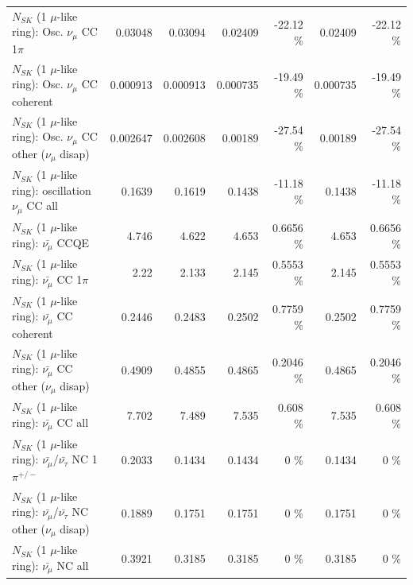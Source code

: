 \begin{table}
\begin{tabular}{| l | r | r | r  r | r  r |}
                          $N_{SK}$ (1 $\mu$-like ring): Osc. $\nu_\mu$ CC 1$\pi$ &         0.03048 &         0.03094 &         0.02409 &   -22.12 \%  &         0.02409 &   -22.12 \%  \\ 
                        $N_{SK}$ (1 $\mu$-like ring): Osc. $\nu_\mu$ CC coherent &        0.000913 &        0.000913 &        0.000735 &   -19.49 \%  &        0.000735 &   -19.49 \%  \\ 
         $N_{SK}$ (1 $\mu$-like ring): Osc. $\nu_\mu$ CC other ($\nu_\mu$ disap) &        0.002647 &        0.002608 &         0.00189 &   -27.54 \%  &         0.00189 &   -27.54 \%  \\ 
                      $N_{SK}$ (1 $\mu$-like ring): oscillation $\nu_\mu$ CC all &          0.1639 &          0.1619 &          0.1438 &   -11.18 \%  &          0.1438 &   -11.18 \%  \\ 
\hline
\hline
                              $N_{SK}$ (1 $\mu$-like ring): $\bar{\nu_\mu}$ CCQE &           4.746 &           4.622 &           4.653 &   0.6656 \%  &           4.653 &   0.6656 \%  \\ 
                         $N_{SK}$ (1 $\mu$-like ring): $\bar{\nu_\mu}$ CC 1$\pi$ &            2.22 &           2.133 &           2.145 &   0.5553 \%  &           2.145 &   0.5553 \%  \\ 
                       $N_{SK}$ (1 $\mu$-like ring): $\bar{\nu_\mu}$ CC coherent &          0.2446 &          0.2483 &          0.2502 &   0.7759 \%  &          0.2502 &   0.7759 \%  \\ 
        $N_{SK}$ (1 $\mu$-like ring): $\bar{\nu_\mu}$ CC other ($\nu_\mu$ disap) &          0.4909 &          0.4855 &          0.4865 &   0.2046 \%  &          0.4865 &   0.2046 \%  \\ 
                          $N_{SK}$ (1 $\mu$-like ring): $\bar{\nu_{\mu}}$ CC all &           7.702 &           7.489 &           7.535 &    0.608 \%  &           7.535 &    0.608 \%  \\ 
\hline
  $N_{SK}$ (1 $\mu$-like ring): $\bar{\nu_\mu}$/$\bar{\nu_\tau}$ NC 1$\pi^{+/-}$ &          0.2033 &          0.1434 &          0.1434 &        0 \%  &          0.1434 &        0 \%  \\ 
$N_{SK}$ (1 $\mu$-like ring): $\bar{\nu_\mu}$/$\bar{\nu_\tau}$ NC other ($\nu_\mu$ disap) &          0.1889 &          0.1751 &          0.1751 &        0 \%  &          0.1751 &        0 \%  \\ 
                          $N_{SK}$ (1 $\mu$-like ring): $\bar{\nu_{\mu}}$ NC all &          0.3921 &          0.3185 &          0.3185 &        0 \%  &          0.3185 &        0 \%  \\ 

\end{tabular}
\end{table}
